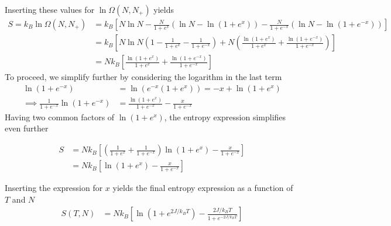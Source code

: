 \documentclass[reprint,english,notitlepage,aps,nobalancelastpage,nofootinbib]{revtex4-1}
\newcommand{\closed}[1]{\left(#1\right)}
\newcommand{\bracket}[1]{\left[#1\right]}
\newcommand{\np}{N_+}
\newcommand{\kb}{k_B}
\begin{document}
Inserting these values for $\ln\Omega(N,\np)$ yields 
\begin{align*}
	S=\kb \ln\Omega(N,\np) &= \kb \bracket{N\ln N - \frac{N}{1+e^x}\closed{\ln N - \ln(1+e^x)} - \frac{N}{1+e^{-x}} \closed{\ln N - \ln(1+e^{-x})}} \\ 
	&=\kb \bracket{N\ln N \closed{1 - \frac{1}{1+e^x} - \frac{1}{1+e^{-x}}} + N\closed{\frac{\ln(1+e^x)}{1+e^x} + \frac{\ln(1+e^{-x})}{1+e^{-x}}}} \\ 
	&= N\kb \bracket{\frac{\ln(1+e^x)}{1+e^x} + \frac{\ln(1+e^{-x})}{1+e^{-x}}}
\end{align*}
To proceed, we simplify further by considering the logarithm in the last term 
\begin{align*}
	\ln(1+e^{-x}) &= \ln(e^{-x}(1+e^x)) = -x + \ln(1+e^x) \\ 
	\implies \frac{1}{1+e^{-x}}\ln(1+e^{-x}) &= \frac{\ln(1+e^x)}{1+e^{-x}} - \frac{x}{1+e^{-x}}
\end{align*}
Having two common factors of $\ln(1+e^x)$, the entropy expression simplifies even further 

\begin{align*}
	S &= N\kb \bracket{\closed{\frac{1}{1+e^x} + \frac{1}{1+e^{-x}}}\ln(1+e^x) - \frac{x}{1+e^{-x}}} \\ 
	&= N\kb \bracket{\ln(1+e^x) - \frac{x}{1+e^{-x}}}
\end{align*}

Inserting the expression for $x$ yields the final entropy expression as a function of $T$ and $N$
\begin{align}
	S(T,N) &= N\kb \bracket{\ln\closed{1+e^{2J/\kb T}} - \frac{2J/\kb T}{1+e^{-2J/\kb T}}}
\end{align}
\end{document}

